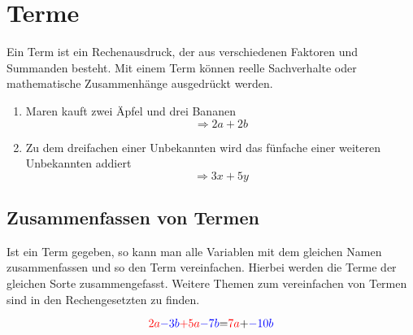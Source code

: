\section{Terme}\label{sec:Terme}
Ein Term ist ein Rechenausdruck, der aus verschiedenen Faktoren und Summanden besteht. Mit einem Term können reelle Sachverhalte oder mathematische Zusammenhänge ausgedrückt werden.

\begin{beispiel}
\begin{enumerate}
	\item Maren kauft zwei Äpfel und drei Bananen
\[\Rightarrow2a+2b\]
\item Zu dem dreifachen einer Unbekannten wird das fünfache einer weiteren Unbekannten addiert
\[\Rightarrow 3x+5y\]
\end{enumerate}
\end{beispiel}

\subsection{Zusammenfassen von Termen}\label{sec:Zusammenfassen von Termen}
Ist ein Term gegeben, so kann man alle Variablen mit dem gleichen Namen zusammenfassen und so den Term vereinfachen. Hierbei werden die Terme der gleichen Sorte zusammengefasst. Weitere Themen zum vereinfachen von Termen sind in den Rechengesetzten zu finden.

\begin{beispiel}
	\[\color{red}{2a}\color{blue}{-3b} \color{red}{+5a}\color{blue}{-7b}\color{black}{=}\color{red}{7a}\color{black}{+}\color{blue}{-10b} \]
\end{beispiel}

